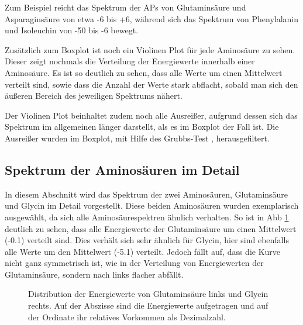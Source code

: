 Zum Beispiel reicht das Spektrum der \ac{APs} von Glutaminsäure und Asparaginsäure von etwa -6 bis +6, während sich das Spektrum von Phenylalanin und Isoleuchin von -50 bis -6 bewegt. 

Zusätzlich zum Boxplot ist noch ein Violinen Plot für jede Aminosäure zu sehen. Dieser zeigt nochmals die Verteilung der Energiewerte innerhalb einer Aminosäure. Es ist so deutlich zu sehen, dass alle Werte um einen Mittelwert verteilt sind, sowie dass die Anzahl der Werte stark abflacht, sobald man sich den äußeren Bereich des jeweiligen Spektrums nähert.

Der Violinen Plot beinhaltet zudem noch alle Ausreißer, aufgrund dessen sich das Spektrum im allgemeinen länger darstellt, als es im Boxplot der Fall ist. Die Ausreißer wurden im Boxplot, mit Hilfe des Grubbs-Test \cite{Jain.2010}, herausgefiltert. 


\newpage
\subsection{Spektrum der Aminosäuren im Detail}
In diesem Abschnitt wird das Spektrum der zwei Aminosäuren, Glutaminsäure und Glycin im Detail vorgestellt. Diese beiden Aminosäuren wurden exemplarisch ausgewählt, da sich alle Aminosäurespektren ähnlich verhalten. So ist in \ac{Abb} \ref{fig:ep_as_distr} deutlich zu sehen, dass alle Energiewerte der Glutaminsäure um einen Mittelwert (-0.1) verteilt sind. Dies verhält sich sehr ähnlich für Glycin, hier sind ebenfalls alle Werte um den Mittelwert (-5.1) verteilt. Jedoch fällt auf, dass die Kurve nicht ganz symmetrisch ist, wie in der Verteilung von Energiewerten der Glutaminsäure, sondern nach links flacher abfällt. 

\begin{figure}[H]
    \caption{Distribution der Energiewerte von Glutaminsäure links und Glycin rechts. Auf der Abszisse sind die Energiewerte aufgetragen und auf der Ordinate ihr relatives Vorkommen als Dezimalzahl.} 
    \label{fig:ep_as_distr}
\end{figure}

